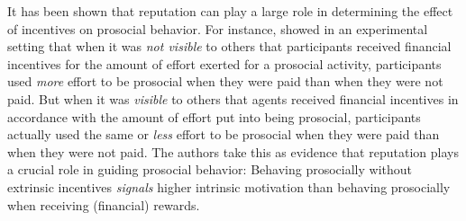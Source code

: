 \documentclass[AER]{AEA}
\begin{document}
It has been shown that reputation can play a large role in determining the effect of incentives on prosocial behavior. For instance, \cite{ariely_doing_2009} showed in an experimental setting that when it was \textit{not visible} to others that participants received financial incentives for the amount of effort exerted for a prosocial activity, participants used \textit{more} effort to be prosocial when they were paid than when they were not paid. But when it was \textit{visible} to others that agents received financial incentives in accordance with the amount of effort put into being prosocial, participants actually used the same or \textit{less} effort to be prosocial when they were paid than when they were not paid. The authors take this as evidence that reputation plays a crucial role in guiding prosocial behavior: Behaving prosocially without extrinsic incentives \textit{signals} higher intrinsic motivation than behaving prosocially when receiving (financial) rewards. 
\end{document}
